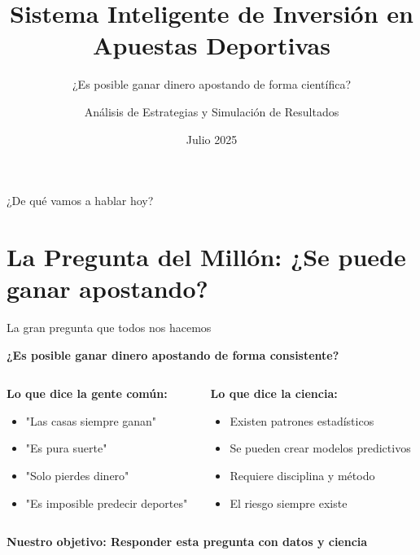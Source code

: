 \documentclass[aspectratio=169]{beamer}
\title{Sistema Inteligente de Inversión en Apuestas Deportivas}
\subtitle{¿Es posible ganar dinero apostando de forma científica?}
\author{Análisis de Estrategias y Simulación de Resultados}
\date{Julio 2025}
\begin{document}
\begin{frame}
\titlepage
\end{frame}

\begin{frame}{¿De qué vamos a hablar hoy?}
\tableofcontents
\end{frame}

\section{La Pregunta del Millón: ¿Se puede ganar apostando?}

\begin{frame}{La gran pregunta que todos nos hacemos}
\begin{center}
\Large
\textcolor{azulprincipal}{\textbf{¿Es posible ganar dinero apostando de forma consistente?}}
\end{center}

\vspace{0.5cm}

\begin{columns}
\begin{column}{0.5\textwidth}
\textbf{Lo que dice la gente común:}
\begin{itemize}
\item "Las casas siempre ganan"
\item "Es pura suerte"
\item "Solo pierdes dinero"
\item "Es imposible predecir deportes"
\end{itemize}
\end{column}
\begin{column}{0.5\textwidth}
\textbf{Lo que dice la ciencia:}
\begin{itemize}
\item \textcolor{verdeganancia}{Existen patrones estadísticos}
\item \textcolor{azulprincipal}{Se pueden crear modelos predictivos}
\item \textcolor{naranjaatencion}{Requiere disciplina y método}
\item \textcolor{rojoperdida}{El riesgo siempre existe}
\end{itemize}
\end{column}
\end{columns}

\vspace{0.5cm}
\begin{center}
\textbf{Nuestro objetivo: Responder esta pregunta con datos y ciencia}
\end{center}
\end{frame}
\end{document}
